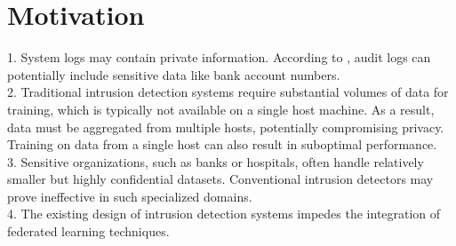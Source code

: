 \section{Motivation}
\label{sec:motivation}

1. System logs may contain private information. According to \cite{datadog}, audit logs can potentially include sensitive data like bank account numbers. \\

2. Traditional intrusion detection systems require substantial volumes of data for training, which is typically not available on a single host machine. As a result, data must be aggregated from multiple hosts, potentially compromising privacy. Training on data from a single host can also result in suboptimal performance. \\

3. Sensitive organizations, such as banks or hospitals, often handle relatively smaller but highly confidential datasets. Conventional intrusion detectors may prove ineffective in such specialized domains. \\

4. The existing design of intrusion detection systems impedes the integration of federated learning techniques. \\